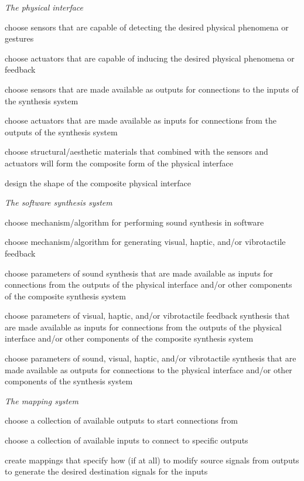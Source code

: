 \begin{description}
\item \emph{The physical interface}
\begin{description}
\item choose sensors that are capable of detecting the desired physical phenomena or gestures
\item choose actuators that are capable of inducing the desired physical phenomena or feedback
\item choose sensors that are made available as outputs for connections to the inputs of the synthesis system
\item choose actuators that are made available as inputs for connections from the outputs of the synthesis system
\item choose structural/aesthetic materials that combined with the sensors and actuators will form the composite form of the physical interface
\item design the shape of the composite physical interface
\end{description}
\item \emph{The software synthesis system}
\begin{description}
\item choose mechanism/algorithm for performing sound synthesis in software
\item choose mechanism/algorithm for generating visual, haptic, and/or vibrotactile feedback
\item choose parameters of sound synthesis that are made available as inputs for connections from the outputs of the physical interface and/or other components of the composite synthesis system
\item choose parameters of visual, haptic, and/or vibrotactile feedback synthesis that are made available as inputs for connections from the outputs of the physical interface and/or other components of the composite synthesis system
\item choose parameters of sound, visual, haptic, and/or vibrotactile synthesis that are made available as outputs for connections to the physical interface and/or other components of the synthesis system
\end{description}
\item \emph{The mapping system}
\begin{description}
	\item choose a collection of available outputs to start connections from
	\item choose a collection of available inputs to connect to specific outputs
	\item create mappings that specify how (if at all) to modify source signals from outputs to generate the desired destination signals for the inputs
\end{description}
\end{description}

